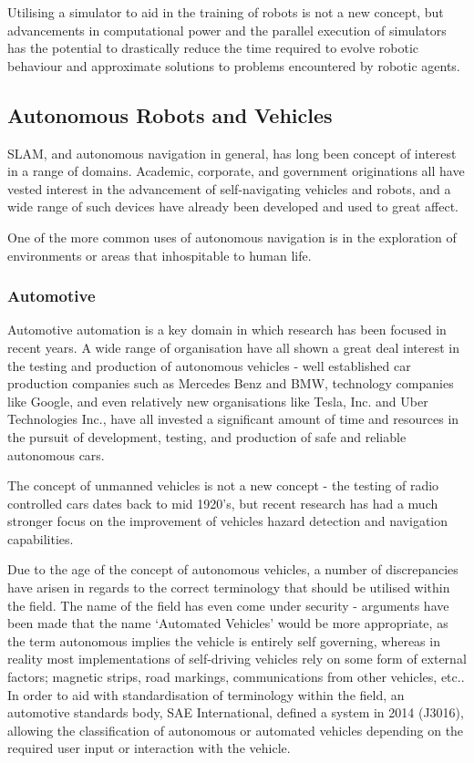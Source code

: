 Utilising a simulator to aid in the training of robots is not a new concept,
but advancements in computational power and the parallel execution of
simulators has the potential to drastically reduce the time required to evolve
robotic behaviour and approximate solutions to problems encountered by robotic
agents.

\pagebreak

\subsection{Autonomous Robots and Vehicles}
SLAM, and autonomous navigation in general, has long been concept of interest
in a range of domains.
Academic, corporate, and government originations all have vested interest in
the advancement of self-navigating vehicles and robots, and a wide range of
such devices have already been developed and used to great affect.

One of the more common uses of autonomous navigation is in the exploration of
environments or areas that inhospitable to human life.

\subsubsection{Automotive}
Automotive automation is a key domain in which research has been focused in
recent years.
A wide range of organisation have all shown a great deal interest in the testing
and production of autonomous vehicles - well established car production companies
such as Mercedes Benz and BMW, technology companies like Google, and even
relatively new organisations like Tesla, Inc. and Uber Technologies Inc., have
all invested a significant amount of time and resources in the pursuit of
development, testing, and production of safe and reliable autonomous cars.

The concept of unmanned vehicles is not a new concept - the testing of radio
controlled cars dates back to mid 1920's, but recent research has had a much
stronger focus on the improvement of vehicles hazard detection and navigation
capabilities.

Due to the age of the concept of autonomous vehicles, a number of discrepancies
have arisen in regards to the correct terminology that should be utilised
within the field.
The name of the field has even come under security - arguments have been made
that the name `Automated Vehicles' would be more appropriate, as the term
autonomous implies the vehicle is entirely self governing, whereas in
reality most implementations of self-driving vehicles rely on some form of
external factors; magnetic strips, road markings, communications from other
vehicles, etc..
In order to aid with standardisation of terminology within the field, an
automotive standards body, SAE International, defined a system in 2014
(J3016), allowing the classification of autonomous or automated vehicles
depending on the required user input or interaction with the vehicle.

